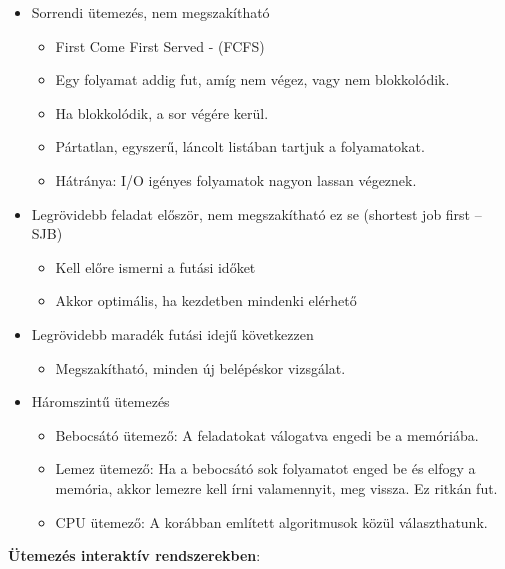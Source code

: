 \documentclass[margin=0px]{article}
\begin{document}
	\begin{itemize}
		\item Sorrendi ütemezés, nem megszakítható
		\begin{itemize}
			\item First Come First Served - (FCFS)
			\item Egy folyamat addig fut, amíg nem végez, vagy nem blokkolódik.
			\item Ha blokkolódik, a sor végére kerül.
			\item Pártatlan, egyszerű, láncolt listában tartjuk a folyamatokat.
			\item Hátránya: I/O igényes folyamatok nagyon lassan végeznek.
		\end{itemize}
		\item Legrövidebb feladat először, nem megszakítható ez se (shortest job first -- SJB)
		\begin{itemize}
			\item Kell előre ismerni a futási időket
			\item Akkor optimális, ha kezdetben mindenki elérhető
		\end{itemize}
		\item Legrövidebb maradék futási idejű következzen
		\begin{itemize}
			\item Megszakítható, minden új belépéskor vizsgálat.
		\end{itemize}
		\item Háromszintű ütemezés
		\begin{itemize}
			\item Bebocsátó ütemező: A feladatokat válogatva engedi be a memóriába.
			\item Lemez ütemező: Ha a bebocsátó sok folyamatot enged be és elfogy a memória, akkor lemezre kell írni valamennyit, meg vissza. Ez ritkán fut.
			\item CPU ütemező: A korábban említett algoritmusok közül választhatunk.
		\end{itemize}
	\end{itemize}
	\textbf{Ütemezés interaktív rendszerekben}:
\end{document}
